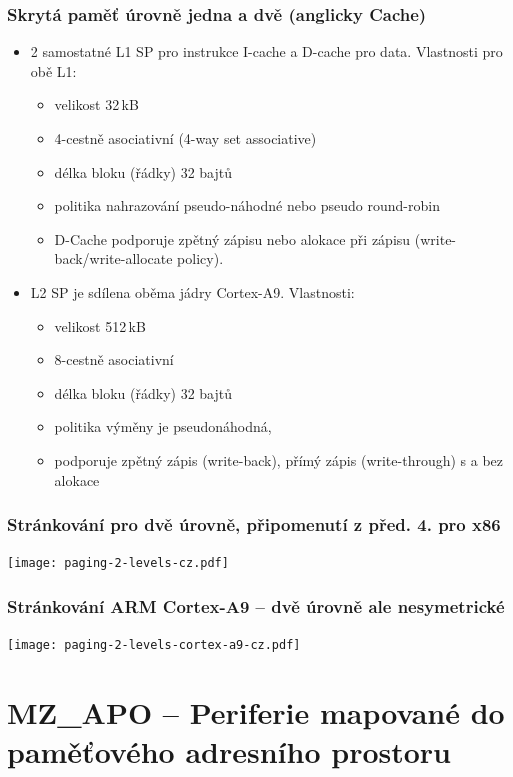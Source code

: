 \documentclass{beamer}
\begin{document}
\begin{frame}
\frametitle{Skrytá paměť úrovně jedna a dvě (anglicky Cache)}
\begin{itemize}
 \item 2 samostatné L1 SP pro instrukce I-cache a D-cache pro data. Vlastnosti pro obě L1:
 \begin{itemize}
  \item velikost 32\,kB
  \item 4-cestně asociativní (4-way set associative)
  \item délka bloku (řádky) 32 bajtů
  \item politika nahrazování pseudo-náhodné nebo pseudo round-robin
  \item D-Cache podporuje zpětný zápisu nebo alokace při zápisu (write-back/write-allocate policy).
 \end{itemize}
 \item L2 SP je sdílena oběma jádry Cortex-A9. Vlastnosti:
 \begin{itemize}
   \item velikost 512\,kB
   \item 8-cestně asociativní
   \item délka bloku (řádky) 32 bajtů
   \item politika výměny je pseudonáhodná,
   \item  podporuje zpětný zápis (write-back), přímý zápis (write-through) s a bez alokace
 \end{itemize}
\end{itemize}

\end{frame}

\begin{frame}
\frametitle{Stránkování pro dvě úrovně, připomenutí z před. 4. pro x86}

\texttt{[image: paging-2-levels-cz.pdf]}

\end{frame}

\begin{frame}
\frametitle{Stránkování ARM Cortex-A9 -- dvě úrovně ale nesymetrické}

\texttt{[image: paging-2-levels-cortex-a9-cz.pdf]}

\end{frame}

\section{MZ\_APO -- Periferie mapované do paměťového adresního prostoru}
\end{document}
